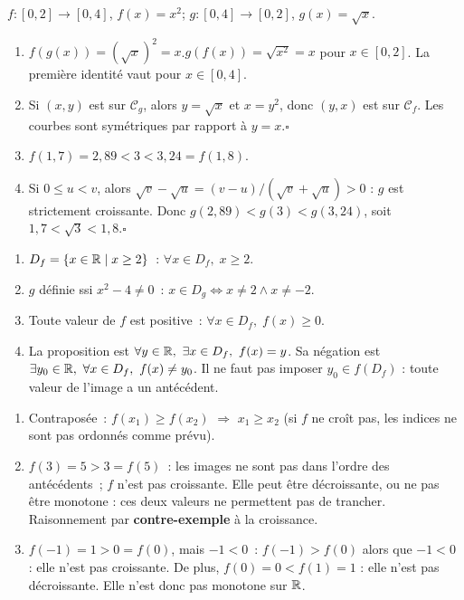 $f:[0,2]\to[0,4]$, $f(x)=x^2$; $g:[0,4]\to[0,2]$, $g(x)=\sqrt{x}$.
\begin{enumerate}
  \item $f(g(x))=(\sqrt{x})^2=x$.\checkmark\quad $g(f(x))=\sqrt{x^2}=x$ pour $x\in[0,2]$.
        La premi\`ere identit\'e vaut pour $x\in[0,4]$.\checkmark
  \item Si $(x,y)$ est sur $\mathcal{C}_g$, alors $y=\sqrt{x}$ et $x=y^2$, donc $(y,x)$ est sur $\mathcal{C}_f$.
        Les courbes sont sym\'etriques par rapport \`a $y=x$.\hfill$\square$
  \item $f(1{,}7)=2{,}89<3<3{,}24=f(1{,}8)$.
  \item Si $0\leq u<v$, alors
        $\sqrt v-\sqrt u=(v-u)/(\sqrt v+\sqrt u)>0$ : $g$ est strictement croissante.
        Donc $g(2{,}89)<g(3)<g(3{,}24)$, soit $1{,}7<\sqrt3<1{,}8$.\hfill$\square$
\end{enumerate}


\begin{enumerate}
  \item $D_f=\{x\in\mathbb{R}\mid x\geq2\}$~: $\forall x\in D_f,\;x\geq2$.
  \item $g$ d\'efinie ssi $x^2-4\ne0$~:
        $x\in D_g\Leftrightarrow x\ne2\wedge x\ne-2$.
  \item \og Toute valeur de $f$ est positive\fg~:
        $\forall x\in D_f,\;f(x)\geq0$.
  \item La proposition est $\forall y\in\R,\ \exists x\in D_f,\ f(x)=y$.
        Sa n\'egation est $\exists y_0\in\mathbb{R},\ \forall x\in D_f,\ f(x)\ne y_0$.
        Il ne faut pas imposer $y_0\in f(D_f)$ : toute valeur de l'image a un ant\'ec\'edent.
\end{enumerate}


\begin{enumerate}
  \item Contrapos\'ee~: \og $f(x_1)\geq f(x_2)$\fg{} $\Rightarrow$
        \og $x_1\geq x_2$\fg{}
        (si $f$ ne croît pas, les indices ne sont pas ordonn\'es comme pr\'evu).
  \item $f(3)=5>3=f(5)$~: les images ne sont pas dans l'ordre des ant\'ec\'edents~;
        $f$ n'est pas croissante. Elle peut \^etre d\'ecroissante,
        ou ne pas \^etre monotone : ces deux valeurs ne permettent pas de trancher.
        Raisonnement par \textbf{contre-exemple} \`a la croissance.
  \item $f(-1)=1>0=f(0)$, mais $-1<0$~: $f(-1)>f(0)$ alors que $-1<0$ : elle n'est pas croissante.
        De plus, $f(0)=0<f(1)=1$ : elle n'est pas d\'ecroissante.
        Elle n'est donc pas monotone sur $\mathbb{R}$.
\end{enumerate}

